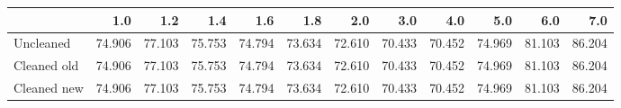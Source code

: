 \begin{tabular}{lrrrrrrrrrrr}
\toprule
{} &    1.0 &    1.2 &    1.4 &    1.6 &    1.8 &    2.0 &    3.0 &    4.0 &    5.0 &    6.0 &    7.0 \\
\midrule
Uncleaned   & 74.906 & 77.103 & 75.753 & 74.794 & 73.634 & 72.610 & 70.433 & 70.452 & 74.969 & 81.103 & 86.204 \\
Cleaned old & 74.906 & 77.103 & 75.753 & 74.794 & 73.634 & 72.610 & 70.433 & 70.452 & 74.969 & 81.103 & 86.204 \\
Cleaned new & 74.906 & 77.103 & 75.753 & 74.794 & 73.634 & 72.610 & 70.433 & 70.452 & 74.969 & 81.103 & 86.204 \\
\bottomrule
\end{tabular}
